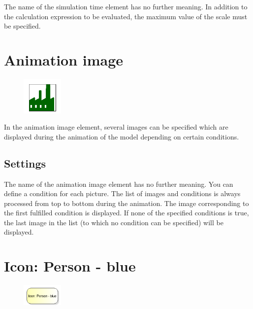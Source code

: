 The name of the simulation time element has no further meaning.
In addition to the calculation expression to be evaluated,
the maximum value of the scale must be specified.


\section{Animation image}
\label{ref:ModelElementAnimationImage}

\begin{figure}
\vspace{-22pt}
\includegraphics[width=2cm]{imageModelElementAnimationImage.png}
\vspace{-22pt}
\end{figure}

In the animation image element, several images can be specified
which are displayed during the animation of the model
depending on certain conditions.

\subsection*{Settings}

The name of the animation image element has no further meaning.
You can define a condition for each picture. The list of images and conditions
is always processed from top to bottom during the animation.
The image corresponding to the first fulfilled condition is displayed.
If none of the specified conditions is true, the last image in the list
(to which no condition can be specified) will be displayed.


\section{Icon: Person - blue}
\label{ref:ModelElementClientIcon}

\begin{figure}
\vspace{-22pt}
\includegraphics[width=2cm]{imageModelElementClientIcon.png}
\vspace{-22pt}
\end{figure}

